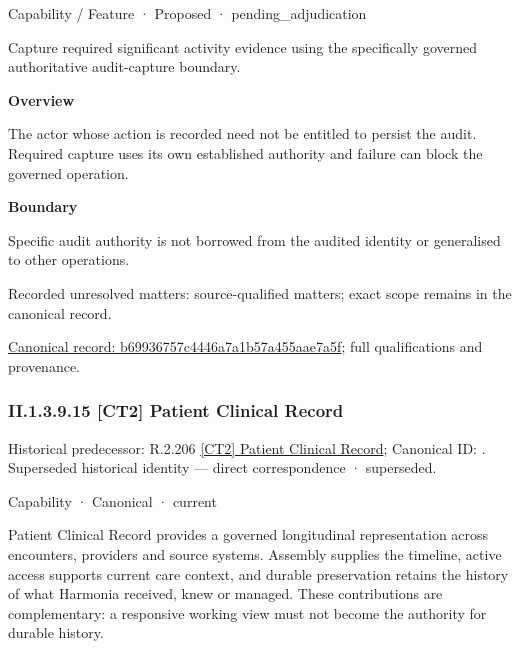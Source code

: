 \label{element:b69936757c4446a7a1b57a455aae7a5f}
{\small Capability / Feature · Proposed · pending\_adjudication}\par

Capture required significant activity evidence using the specifically governed authoritative audit-capture boundary.



\textbf{Overview}



The actor whose action is recorded need not be entitled to persist the audit. Required capture uses its own established authority and failure can block the governed operation.



\textbf{Boundary}



Specific audit authority is not borrowed from the audited identity or generalised to other operations.


{\small Recorded unresolved matters: source-qualified matters; exact scope remains in the canonical record.}\par
{\footnotesize \href{../../../../../../../continuum/strategy/capability/feature/b69936757c4446a7a1b57a455aae7a5f.md}{Canonical record: b69936757c4446a7a1b57a455aae7a5f}; full qualifications and provenance.}\par
\subsubsection*{II.1.3.9.15 [CT2] Patient Clinical Record}
\label{navigation:II.1.3.9.15}

{\small Historical predecessor: R.2.206 \hyperref[element:2e4de521bda24ad7b0ea64ae535b7f84]{[CT2] Patient Clinical Record}; Canonical ID: \texttt{}. Superseded historical identity — direct correspondence · superseded.}\par
\label{element:5478878e0e6e4d34a8d5023ac6ac2d54}
{\small Capability · Canonical · current}\par

Patient Clinical Record provides a governed longitudinal representation across encounters, providers and source systems. Assembly supplies the timeline, active access supports current care context, and durable preservation retains the history of what Harmonia received, knew or managed. These contributions are complementary: a responsive working view must not become the authority for durable history.



